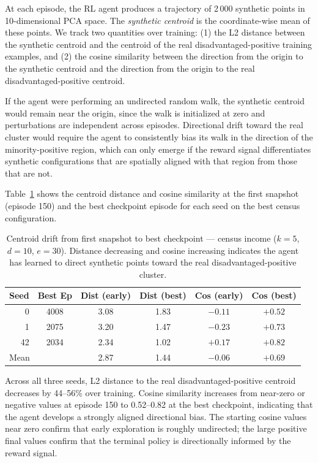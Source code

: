 \documentclass[12pt]{article}
\begin{document}
At each episode, the RL agent produces a trajectory of 2\,000 synthetic
points in 10-dimensional PCA space.
The \emph{synthetic centroid} is the coordinate-wise mean of these points.
We track two quantities over training: (1) the L2 distance between the
synthetic centroid and the centroid of the real disadvantaged-positive
training examples, and (2) the cosine similarity between the direction
from the origin to the synthetic centroid and the direction from the
origin to the real disadvantaged-positive centroid.

If the agent were performing an undirected random walk, the synthetic
centroid would remain near the origin, since the walk is initialized at
zero and perturbations are independent across episodes.
Directional drift toward the real cluster would require the agent to
consistently bias its walk in the direction of the minority-positive region,
which can only emerge if the reward signal differentiates synthetic
configurations that are spatially aligned with that region from those
that are not.

Table~\ref{tab:centroid-drift} shows the centroid distance and cosine
similarity at the first snapshot (episode 150) and the best checkpoint
episode for each seed on the best census configuration.

\begin{table}[h]
\centering
\caption{Centroid drift from first snapshot to best checkpoint — census
income ($k=5$, $d=10$, $e=30$). Distance decreasing and cosine increasing
indicates the agent has learned to direct synthetic points toward the real
disadvantaged-positive cluster.}
\label{tab:centroid-drift}
\small
\renewcommand{\arraystretch}{1.2}
\begin{tabular}{@{}rccccc@{}}
\toprule
Seed & Best Ep & Dist (early) & Dist (best) & Cos (early) & Cos (best) \\
\midrule
0  & 4008 & 3.08 & 1.83 & $-0.11$ & $+0.52$ \\
1  & 2075 & 3.20 & 1.47 & $-0.23$ & $+0.73$ \\
42 & 2034 & 2.34 & 1.02 & $+0.17$ & $+0.82$ \\
\midrule
\multicolumn{2}{l}{Mean} & 2.87 & 1.44 & $-0.06$ & $+0.69$ \\
\bottomrule
\end{tabular}
\end{table}

Across all three seeds, L2 distance to the real disadvantaged-positive
centroid decreases by 44--56\% over training.
Cosine similarity increases from near-zero or negative values at episode
150 to 0.52--0.82 at the best checkpoint, indicating that the agent
develops a strongly aligned directional bias.
The starting cosine values near zero confirm that early exploration is
roughly undirected; the large positive final values confirm that the
terminal policy is directionally informed by the reward signal.
\end{document}
